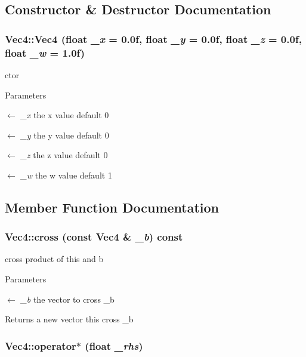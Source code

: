 \subsection{Constructor \& Destructor Documentation}
\hypertarget{classVec4_aa433bf04a2457800e141c7df59d72763}{
\subsubsection[{Vec4}]{\setlength{\rightskip}{0pt plus 5cm}Vec4::Vec4 (float {\em \_\-x} = {\ttfamily 0.0f}, \/  float {\em \_\-y} = {\ttfamily 0.0f}, \/  float {\em \_\-z} = {\ttfamily 0.0f}, \/  float {\em \_\-w} = {\ttfamily 1.0f})}}
\label{classVec4_aa433bf04a2457800e141c7df59d72763}


ctor 
\begin{DoxyParams}{Parameters}
\item[\mbox{$\leftarrow$} {\em \_\-x}]the x value default 0 \item[\mbox{$\leftarrow$} {\em \_\-y}]the y value default 0 \item[\mbox{$\leftarrow$} {\em \_\-z}]the z value default 0 \item[\mbox{$\leftarrow$} {\em \_\-w}]the w value default 1 \end{DoxyParams}


\subsection{Member Function Documentation}
\hypertarget{classVec4_ad8c09b1c096d065e117ffac51462bb0f}{
\subsubsection[{cross}]{ Vec4::cross (const {\bf Vec4} \& {\em \_\-b}) const}}
\label{classVec4_ad8c09b1c096d065e117ffac51462bb0f}


cross product of this and b 
\begin{DoxyParams}{Parameters}
\item[\mbox{$\leftarrow$} {\em \_\-b}]the vector to cross \_\-b \end{DoxyParams}
\begin{DoxyReturn}{Returns}
a new vector this cross \_\-b 
\end{DoxyReturn}
\hypertarget{classVec4_a55ed28fa7c5f6c3582a929dbac9a7284}{
\subsubsection[{operator$\ast$}]{ Vec4::operator$\ast$ (float {\em \_\-rhs})}}
\label{classVec4_a55ed28fa7c5f6c3582a929dbac9a7284}


